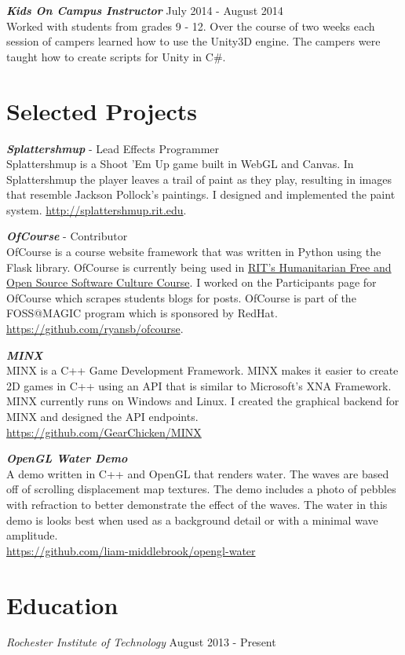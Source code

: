 \documentclass[line,margin]{res}
\begin{document}
\begin{resume}
{\textbf{\emph{Kids On Campus Instructor}}} \hfill July 2014 - August 2014\\
Worked with students from grades 9 - 12. Over the course of two weeks each session of campers
learned how to use the Unity3D engine. The campers were taught how to create scripts for Unity
in C\#.


\section{Selected Projects}

{\textbf{\emph{Splattershmup}}} - Lead Effects Programmer\\
Splattershmup is a Shoot 'Em Up game built in WebGL and Canvas. In Splattershmup the player leaves
a trail of paint as they play, resulting in images that resemble Jackson Pollock's paintings.
I designed and implemented the paint system.
\url{http://splattershmup.rit.edu}.

{\textbf{\emph{OfCourse}}} - Contributor\\
OfCourse is a course website framework that was written in Python using the Flask library.
OfCourse is currently being used in \href{http://hfoss-fossrit.rhcloud.com}{RIT's Humanitarian
Free and Open Source Software Culture Course}. I worked on the Participants page for OfCourse
which scrapes students blogs for posts. OfCourse is part of the FOSS@MAGIC
program which is sponsored by RedHat.\\
\url{https://github.com/ryansb/ofcourse}.

{\textbf{\emph{MINX}}}\\
MINX is a C++ Game Development Framework. MINX makes it easier to create 2D games in C++ using an API
that is similar to Microsoft's XNA Framework. MINX currently runs on Windows and Linux. I created the
graphical backend for MINX and designed the API endpoints.\\
\url{https://github.com/GearChicken/MINX}

{\textbf{\emph{OpenGL Water Demo}}}\\
A demo written in C++ and OpenGL that renders water. The waves are based off of scrolling displacement
map textures. The demo includes a photo of pebbles with refraction to better demonstrate the effect
of the waves. The water in this demo is looks best when used as a background detail or with a minimal
wave amplitude.\\
\url{https://github.com/liam-middlebrook/opengl-water}


\section{Education}
{\sl Rochester Institute of Technology} \hfill August 2013 - Present


\end{resume}
\end{document}
